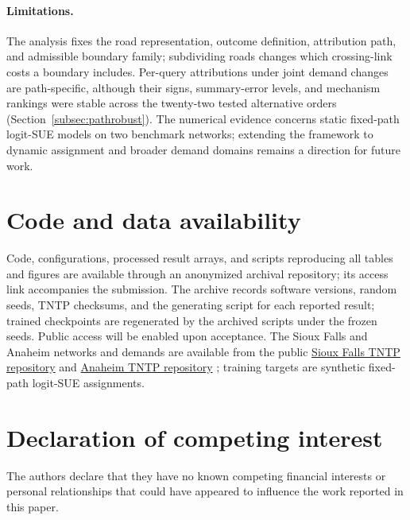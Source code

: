 \documentclass[a4paper,fleqn]{cas-sc}
\begin{document}
\paragraph{Limitations.}
The analysis fixes the road representation, outcome definition,
attribution path, and admissible boundary family; subdividing roads
changes which crossing-link costs a boundary includes. Per-query
attributions under joint demand changes are path-specific, although
their signs, summary-error levels, and mechanism rankings were stable
across the twenty-two tested alternative orders
(Section~\ref{subsec:pathrobust}). The numerical evidence concerns
static fixed-path logit-SUE models on two benchmark networks; extending
the framework to dynamic assignment and broader demand domains remains
a direction for future work.

\section*{Code and data availability}
Code, configurations, processed result arrays, and scripts reproducing
all tables and figures are available through an anonymized archival
repository; its access link accompanies the submission. The archive
records software versions, random seeds,
TNTP checksums, and the generating script for each reported result;
trained checkpoints are regenerated by the archived scripts under the
frozen seeds. Public access will be enabled upon acceptance.
The Sioux Falls and Anaheim networks and demands are available from the public
\href{https://github.com/bstabler/TransportationNetworks/tree/master/SiouxFalls}{Sioux Falls TNTP repository}
and \href{https://github.com/bstabler/TransportationNetworks/tree/master/Anaheim}{Anaheim TNTP repository}
\citep{tnfrc2024transportation}; training targets are synthetic fixed-path
logit-SUE assignments.
\section*{Declaration of competing interest}
The authors declare that they have no known competing financial interests
or personal relationships that could have appeared to influence the work
reported in this paper.
\FloatBarrier

\setlength{\bibsep}{0.8pt plus 0.2pt}

\appendix
{}



\end{document}
